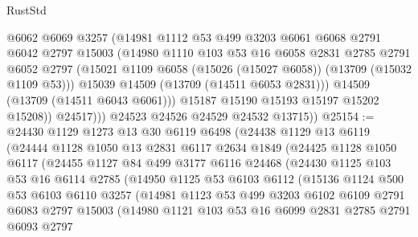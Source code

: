 \begin{lexlean}{RustStd}
\begin{coremodule}
                  @6062
                  @6069
                  @3257
                  (@14981
                    @1112
                    @53
                    @499
                    @3203
                    @6061
                    @6068
                    @2791
                    @6042
                    @2797
                    @15003
                    (@14980
                      @1110
                      @103
                      @53
                      @16
                      @6058
                      @2831
                      @2785
                      @2791
                      @6052
                      @2797
                      (@15021 @1109 @6058 (@15026 (@15027 @6058)) (@13709 (@15032 @1109 @53)))
                      @15039
                      @14509
                      (@13709 (@14511 @6053 @2831)))
                    @14509
                    (@13709 (@14511 @6043 @6061)))
                  @15187
                  @15190
                  @15193
                  @15197
                  @15202
                  @15208))
              @24517)))
        @24523
        @24526
        @24529
        @24532
        @13715))
@25154 := @24430
    @1129
    @1273
    @13
    @30
    @6119
    @6498
    (@24438
      @1129
      @13
      @6119
      (@24444
        @1128
        @1050
        @13
        @2831
        @6117
        @2634
        @1849
        (@24425
          @1128
          @1050
          @6117
          (@24455
            @1127
            @84
            @499
            @3177
            @6116
            @24468
            (@24430
              @1125
              @103
              @53
              @16
              @6114
              @2785
              (@14950
                @1125
                @53
                @6103
                @6112
                (@15136
                  @1124
                  @500
                  @53
                  @6103
                  @6110
                  @3257
                  (@14981
                    @1123
                    @53
                    @499
                    @3203
                    @6102
                    @6109
                    @2791
                    @6083
                    @2797
                    @15003
                    (@14980
                      @1121
                      @103
                      @53
                      @16
                      @6099
                      @2831
                      @2785
                      @2791
                      @6093
                      @2797

\end{coremodule}
\end{lexlean}
